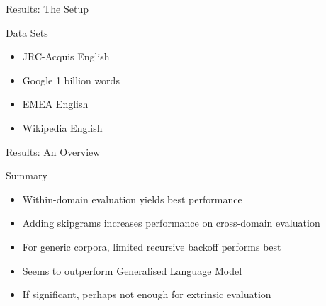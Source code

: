 \begin{frame}{Results: The Setup}
    \begin{block}{Data Sets}
        \begin{itemize}
            \item JRC-Acquis English
            \item Google 1 billion words
            \item EMEA English
            \item Wikipedia English
        \end{itemize}
    \end{block}

\end{frame}
\note[itemize]{
}

\begin{frame}{Results: An Overview}
    \begin{block}{Summary}
        \begin{itemize}
            \item Within-domain evaluation yields best performance
            \item Adding skipgrams increases performance on cross-domain evaluation
            \item For generic corpora, limited recursive backoff performs best
            \item Seems to outperform Generalised Language Model
            \item If significant, perhaps not enough for extrinsic evaluation
        \end{itemize}
    \end{block}
\end{frame}
\note[itemize]{
}

